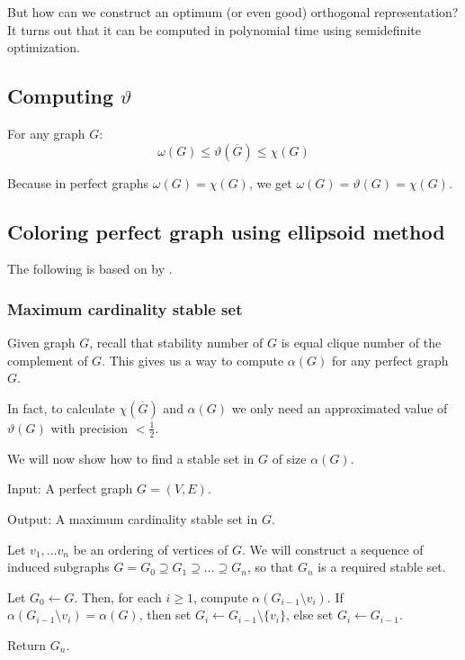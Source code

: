 But how can we construct an optimum (or even good) orthogonal representation? It turns out that it can be computed in polynomial time using semidefinite optimization.

\subsection{Computing \boldmath$\vartheta$}



\begin{theorem}
  \label{thm:sandwich}
  For any graph $G$:
  $$ \omega(G) \leq \vartheta(\overline{G}) \leq \chi(G) $$
\end{theorem}

Because in perfect graphs $\omega(G) = \chi(G)$, we get $\omega(G) = \vartheta(G) = \chi(G)$.


\subsection{Coloring perfect graph using ellipsoid method}
The following is based on  by \citeauthor{Laurent2005} \cite{Laurent2005}.

\subsubsection{Maximum cardinality stable set}

Given graph $G$, recall that stability number of $G$ is equal clique number of the complement of $G$. This gives us a way to compute $\alpha(G)$ for any perfect graph $G$.

In fact, to calculate $\chi(\overline{G})$ and $\alpha(G)$ we only need an approximated value of $\vartheta(G)$ with precision $< \frac{1}{2}$.

We will now show how to find a stable set in $G$ of size $\alpha(G)$.

\begin{alg}
  \label{alg:maxStableSet}
  Input: A perfect graph $G = (V, E)$.

  \noindent Output: A maximum cardinality stable set in $G$.
\end{alg}
\begin{algtext}
  Let $v_1, \ldots v_n$ be an ordering of vertices of $G$. We will construct a sequence of induced subgraphs $G = G_0 \supseteq G_1 \supseteq \ldots \supseteq G_n$, so that $G_n$ is a required stable set.

  Let $G_0 \leftarrow G$. Then, for each $i \geq 1$, compute $\alpha(G_{i-1} \setminus v_i)$. If $\alpha(G_{i-1} \setminus v_i) = \alpha(G)$, then set $G_i \leftarrow G_{i-1} \setminus \{v_i\}$, else set $G_i \leftarrow G_{i-1}$.

  Return $G_n$.
\end{algtext}

